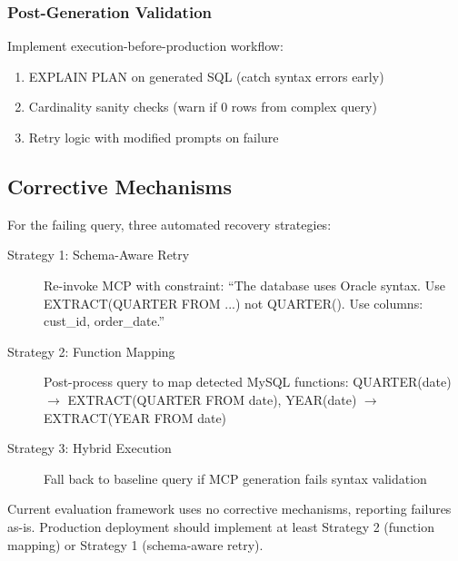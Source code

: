 \subsubsection{Post-Generation Validation}
Implement execution-before-production workflow:
\begin{enumerate}
    \item EXPLAIN PLAN on generated SQL (catch syntax errors early)
    \item Cardinality sanity checks (warn if 0 rows from complex query)
    \item Retry logic with modified prompts on failure
\end{enumerate}

\subsection{Corrective Mechanisms}

For the failing query, three automated recovery strategies:

\begin{description}
    \item[Strategy 1: Schema-Aware Retry] Re-invoke MCP with constraint: ``The database uses Oracle syntax. Use EXTRACT(QUARTER FROM ...) not QUARTER(). Use columns: cust\_id, order\_date.''
    \item[Strategy 2: Function Mapping] Post-process query to map detected MySQL functions: QUARTER(date) $\to$ EXTRACT(QUARTER FROM date), YEAR(date) $\to$ EXTRACT(YEAR FROM date)
    \item[Strategy 3: Hybrid Execution] Fall back to baseline query if MCP generation fails syntax validation
\end{description}

Current evaluation framework uses no corrective mechanisms, reporting failures as-is. Production deployment should implement at least Strategy 2 (function mapping) or Strategy 1 (schema-aware retry).
